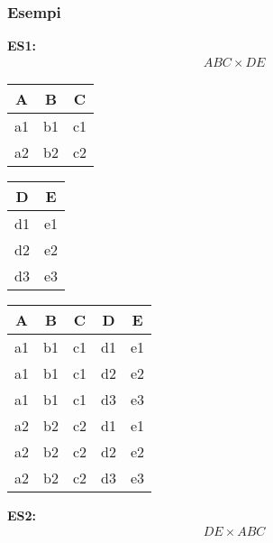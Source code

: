 \subsubsection{Esempi}
\textbf{ES1:}
    \begin{equation}\begin{aligned}
        ABC \times DE
    \end{aligned}\end{equation}
    \begin{center}\begin{tabular}{|c|c|c|}\hline
        \textbf{A} & \textbf{B} & \textbf{C} \\ \hline
        a1 & b1 & c1 \\ \hline
        a2 & b2 & c2 \\ \hline
    \end{tabular}\quad
    \begin{tabular}{|c|c|}\hline
        \textbf{D} & \textbf{E} \\ \hline
        d1 & e1 \\ \hline
        d2 & e2 \\ \hline
        d3 & e3 \\ \hline
    \end{tabular}\quad
    \begin{tabular}{|c|c|c|c|c|}\hline
        \textbf{A} & \textbf{B} & \textbf{C} & 
        \textbf{D}  & \textbf{E} \\ \hline
        a1 & b1 & c1 & d1 & e1\\ \hline
        a1 & b1 & c1 & d2 & e2\\ \hline
        a1 & b1 & c1 & d3 & e3\\ \hline
        a2 & b2 & c2 & d1 & e1\\ \hline
        a2 & b2 & c2 & d2 & e2\\ \hline
        a2 & b2 & c2 & d3 & e3\\ \hline
    \end{tabular}\end{center}
\textbf{ES2:}
    \begin{equation}\begin{aligned}
        DE \times ABC
    \end{aligned}\end{equation}
